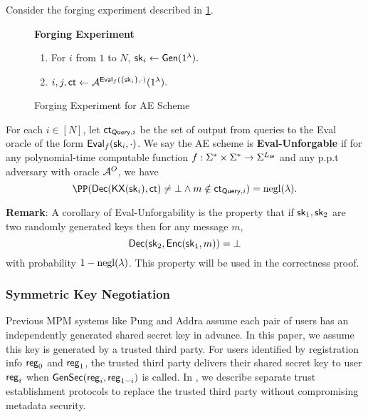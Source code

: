 \begin{definition}
\label{defn:AE-unforgability}
Consider the forging experiment described in \cref{expr:AE-forging}.

\begin{figure}[h!]
\begin{framed}
\textbf{Forging Experiment}
\begin{enumerate}
    \item For $i$ from $1$ to $N$, ${\mathsf{sk}}_i \leftarrow \mathsf{Gen}(1^{\lambda}).$
    \item $i, j, \mathsf{ct} \leftarrow \mathcal{A}^{\mathsf{Eval}_f(\{{\mathsf{sk}}_i\}, \cdot)}(1^{\lambda}).$
\end{enumerate}
\end{framed}
\caption{Forging Experiment for AE Scheme}
\label{expr:AE-forging}
\end{figure}

For each $i \in [N]$, let $\mathsf{ct}_{\mathsf{Query}, i}$ be the set of output from queries to the Eval oracle of the form $\mathsf{Eval}_f({\mathsf{sk}}_i, \cdot)$. We say the AE scheme is \textbf{Eval-Unforgable} if for any polynomial-time computable function $f: \Sigma^* \times \Sigma^* \to \Sigma^{L_{\mathsf{ae}}}$ and any p.p.t adversary with oracle $\mathcal{A}^O$, we have
$$\PP(\dec(\KX(\sk_i), \ct) \neq \bot \land m \notin \ct_{\query, i}) = \negl(\lambda).$$
\end{definition}

\textbf{Remark}: A corollary of Eval-Unforgability is the property that if ${\mathsf{sk}}_1, {\mathsf{sk}}_2$ are two randomly generated keys then for any message $m$, 
$$\mathsf{Dec}({\mathsf{sk}}_2, \mathsf{Enc}({\mathsf{sk}}_1, m)) = \bot$$ 
with probability $1 - \operatorname{negl}(\lambda)$. This property will be used in the correctness proof.

\subsubsection{Symmetric Key Negotiation}
Previous MPM systems like Pung and Addra assume each pair of users has an independently generated shared secret key in advance. In this paper, we assume this key is generated by a trusted third party. For users identified by registration info $\mathsf{reg}_0$ and $\mathsf{reg}_1$, the trusted third party delivers their shared secret key to user $\mathsf{reg}_i$ when $\mathsf{GenSec}(\mathsf{reg}_i, \mathsf{reg}_{1 - i})$ is called. In \cite[Section 4]{whitepaper}, we describe separate trust establishment protocols to replace the trusted third party without compromising metadata security.
